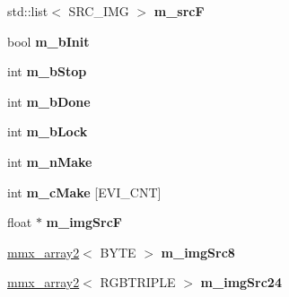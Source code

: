 \begin{DoxyCompactItemize}
\item 
\hypertarget{class_c_v_i_engine_base_a67a15f389d32a0201997a71dc4695803}{std\+::list$<$ S\+R\+C\+\_\+\+I\+M\+G $>$ {\bfseries m\+\_\+src\+F}}\label{class_c_v_i_engine_base_a67a15f389d32a0201997a71dc4695803}

\item 
\hypertarget{class_c_v_i_engine_base_a775fea6c14d39ec6989306017f4f1c9e}{bool {\bfseries m\+\_\+b\+Init}}\label{class_c_v_i_engine_base_a775fea6c14d39ec6989306017f4f1c9e}

\item 
\hypertarget{class_c_v_i_engine_base_a13cd33209e328eed98e79086439748b2}{int {\bfseries m\+\_\+b\+Stop}}\label{class_c_v_i_engine_base_a13cd33209e328eed98e79086439748b2}

\item 
\hypertarget{class_c_v_i_engine_base_aa780c31b49f591af32d9a40e21978201}{int {\bfseries m\+\_\+b\+Done}}\label{class_c_v_i_engine_base_aa780c31b49f591af32d9a40e21978201}

\item 
\hypertarget{class_c_v_i_engine_base_aa909c6b38f749c7b4d848f8b2de331bc}{int {\bfseries m\+\_\+b\+Lock}}\label{class_c_v_i_engine_base_aa909c6b38f749c7b4d848f8b2de331bc}

\item 
\hypertarget{class_c_v_i_engine_base_a4f173a318d25c068952f2c68f4248208}{int {\bfseries m\+\_\+n\+Make}}\label{class_c_v_i_engine_base_a4f173a318d25c068952f2c68f4248208}

\item 
\hypertarget{class_c_v_i_engine_base_a2c62f336b24d613e0320d2e6f676b89b}{int {\bfseries m\+\_\+c\+Make} \mbox{[}E\+V\+I\+\_\+\+C\+N\+T\mbox{]}}\label{class_c_v_i_engine_base_a2c62f336b24d613e0320d2e6f676b89b}

\item 
\hypertarget{class_c_v_i_engine_base_a359f07597366b8c81727c32c9ff931be}{float $\ast$ {\bfseries m\+\_\+img\+Src\+F}}\label{class_c_v_i_engine_base_a359f07597366b8c81727c32c9ff931be}

\item 
\hypertarget{class_c_v_i_engine_base_aa935595a167539c89a4d06a57178d776}{\hyperlink{classmmx__array2}{mmx\+\_\+array2}$<$ B\+Y\+T\+E $>$ {\bfseries m\+\_\+img\+Src8}}\label{class_c_v_i_engine_base_aa935595a167539c89a4d06a57178d776}

\item 
\hypertarget{class_c_v_i_engine_base_a252e6e1285e6063718c7d7a874298363}{\hyperlink{classmmx__array2}{mmx\+\_\+array2}$<$ R\+G\+B\+T\+R\+I\+P\+L\+E $>$ {\bfseries m\+\_\+img\+Src24}}\label{class_c_v_i_engine_base_a252e6e1285e6063718c7d7a874298363}


\end{DoxyCompactItemize}
